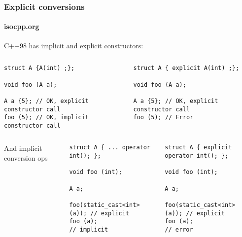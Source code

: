 \begin{frame}[fragile]
\frametitle{Explicit conversions}
\framesubtitle{isocpp.org}
C++98 has implicit and explicit constructors:
\begin{columns}[t]
{\scriptsize
\begin{verbatim}
struct A {A(int) ;};

void foo (A a);

A a {5}; // OK, explicit constructor call
foo (5); // OK, implicit constructor call
\end{verbatim}
}
{\scriptsize \begin{verbatim}
struct A { explicit A(int) ;};

void foo (A a);

A a {5}; // OK, explicit constructor call
foo (5); // Error
\end{verbatim}
}
\end{columns}

\pause{}
\vskip 6pt
\begin{columns}[t]
{\scriptsize
And implicit conversion ops
\begin{verbatim}
struct A { ... operator int(); };

void foo (int);

A a;

foo(static_cast<int>(a)); // explicit
foo (a);                  // implicit

\end{verbatim}
}
{\scriptsize
{}
\begin{verbatim}
struct A { explicit operator int(); };

void foo (int);

A a;

foo(static_cast<int>(a)); // explicit
foo (a);                  // error


\end{verbatim}
}
\end{columns}

\end{frame}


